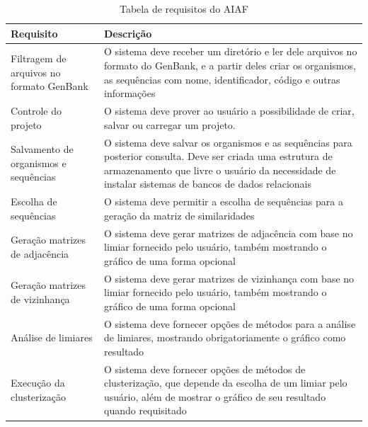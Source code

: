 \begin{table}
\centering
\caption{Tabela de requisitos do AIAF} %
\begin{tabular}{p{5cm}p{10cm}} %
\hline 
Requisito & Descrição \\ 
\hline
\hline
Filtragem de arquivos no formato GenBank & O sistema deve receber um diretório e ler dele arquivos no formato do GenBank, e a partir deles criar os
organismos, as sequências com nome, identificador, código e outras informações\\ \hline
Controle do projeto & O sistema deve prover ao usuário a possibilidade de criar, salvar ou carregar um projeto. \\ \hline
Salvamento de organismos e sequências & O sistema deve salvar os organismos e as sequências para posterior consulta. Deve ser criada uma estrutura de
armazenamento que livre o usuário da necessidade de instalar sistemas de bancos de dados relacionais \\ \hline
Escolha de sequências & O sistema deve permitir a escolha de sequências para a geração da matriz de similaridades \\ \hline
Geração matrizes de adjacência & O sistema deve gerar matrizes de adjacência com base no limiar fornecido pelo usuário, também mostrando o gráfico de uma
forma opcional \\ \hline
Geração matrizes de vizinhança & O sistema deve gerar matrizes de vizinhança com base no limiar fornecido pelo usuário, também mostrando o gráfico de uma
forma opcional \\ \hline
Análise de limiares & O sistema deve fornecer opções de métodos para a análise de limiares, mostrando obrigatoriamente o gráfico como resultado\\ \hline
Execução da clusterização & O sistema deve fornecer opções de métodos de clusterização, que depende da escolha de um limiar pelo usuário, além de mostrar
o gráfico de seu resultado quando requisitado \\ \hline

\end{tabular}
\end{table}
